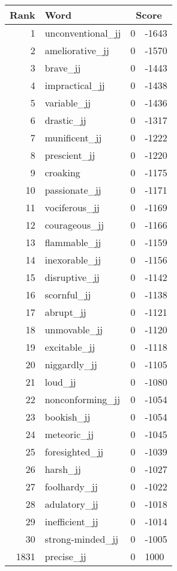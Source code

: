 \begin{longtable}[!htbp]{| rlr@{.}l |}
    \hline
    \textbf{Rank} & \textbf{Word} & \multicolumn{2}{c|}{\textbf{Score}} \\
    \hline
    \endhead
    1 & unconventional\_jj & 0 & -1643 \\
    2 & ameliorative\_jj & 0 & -1570 \\
    3 & brave\_jj & 0 & -1443 \\
    4 & impractical\_jj & 0 & -1438 \\
    5 & variable\_jj & 0 & -1436 \\
    6 & drastic\_jj & 0 & -1317 \\
    7 & munificent\_jj & 0 & -1222 \\
    8 & prescient\_jj & 0 & -1220 \\
    9 & croaking & 0 & -1175 \\
    10 & passionate\_jj & 0 & -1171 \\
    11 & vociferous\_jj & 0 & -1169 \\
    12 & courageous\_jj & 0 & -1166 \\
    13 & flammable\_jj & 0 & -1159 \\
    14 & inexorable\_jj & 0 & -1156 \\
    15 & disruptive\_jj & 0 & -1142 \\
    16 & scornful\_jj & 0 & -1138 \\
    17 & abrupt\_jj & 0 & -1121 \\
    18 & unmovable\_jj & 0 & -1120 \\
    19 & excitable\_jj & 0 & -1118 \\
    20 & niggardly\_jj & 0 & -1105 \\
    21 & loud\_jj & 0 & -1080 \\
    22 & nonconforming\_jj & 0 & -1054 \\
    23 & bookish\_jj & 0 & -1054 \\
    24 & meteoric\_jj & 0 & -1045 \\
    25 & foresighted\_jj & 0 & -1039 \\
    26 & harsh\_jj & 0 & -1027 \\
    27 & foolhardy\_jj & 0 & -1022 \\
    28 & adulatory\_jj & 0 & -1018 \\
    29 & inefficient\_jj & 0 & -1014 \\
    30 & strong-minded\_jj & 0 & -1005 \\
    1831 & precise\_jj & 0 & 1000 \\

\end{longtable}
